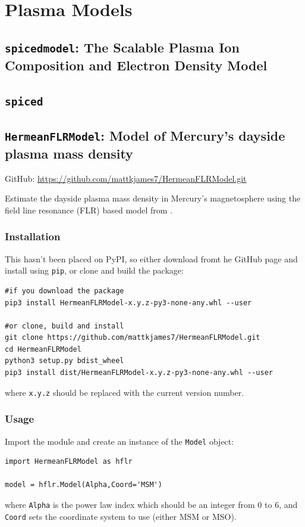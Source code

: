 \chapter{Plasma Models}

	\section{\texttt{spicedmodel}: The Scalable Plasma Ion Composition and Electron Density Model}



	\section{\texttt{spiced}}

	\section{\texttt{HermeanFLRModel}: Model of Mercury's dayside plasma mass density}

		GitHub: \href{https://github.com/mattkjames7/HermeanFLRModel.git}{https://github.com/mattkjames7/HermeanFLRModel.git}

		Estimate the dayside plasma mass density in Mercury's magnetosphere using the field line resonance (FLR) based model from \citet{James2019}.

		\subsection{Installation}

			This hasn't been placed on PyPI, so either download fromt he GitHub page and install using \texttt{pip}, or clone and build the package:
			\begin{verbatim}
#if you download the package
pip3 install HermeanFLRModel-x.y.z-py3-none-any.whl --user

#or clone, build and install
git clone https://github.com/mattkjames7/HermeanFLRModel.git
cd HermeanFLRModel
python3 setup.py bdist_wheel
pip3 install dist/HermeanFLRModel-x.y.z-py3-none-any.whl --user
			\end{verbatim}
			where \texttt{x.y.z} should be replaced with the current version number.

		\subsection{Usage}

			Import the module and create an instance of the \texttt{Model} object:
			\begin{verbatim}
import HermeanFLRModel as hflr

model = hflr.Model(Alpha,Coord='MSM')
			\end{verbatim}
			where \texttt{Alpha} is the power law index which should be an integer from 0 to 6, and \texttt{Coord} sets the coordinate system to use (either MSM or MSO).

